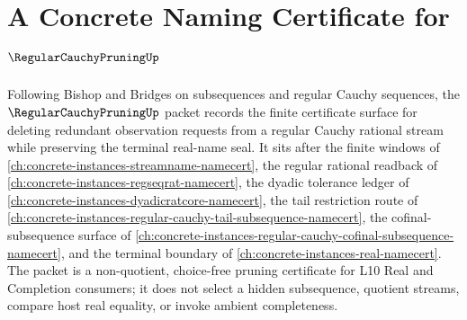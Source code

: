 \chapter{A Concrete Naming Certificate for $\RegularCauchyPruningUp$}
\label{ch:concrete-instances-regular-cauchy-pruning-namecert}

Following Bishop and Bridges on subsequences and regular Cauchy sequences, the $\RegularCauchyPruningUp$ packet records the finite certificate surface for deleting redundant observation requests from a regular Cauchy rational stream while preserving the terminal real-name seal. It sits after the finite windows of \autoref{ch:concrete-instances-streamname-namecert}, the regular rational readback of \autoref{ch:concrete-instances-regseqrat-namecert}, the dyadic tolerance ledger of \autoref{ch:concrete-instances-dyadicratcore-namecert}, the tail restriction route of \autoref{ch:concrete-instances-regular-cauchy-tail-subsequence-namecert}, the cofinal-subsequence surface of \autoref{ch:concrete-instances-regular-cauchy-cofinal-subsequence-namecert}, and the terminal boundary of \autoref{ch:concrete-instances-real-namecert}. The packet is a non-quotient, choice-free pruning certificate for L10 Real and Completion consumers; it does not select a hidden subsequence, quotient streams, compare host real equality, or invoke ambient completeness.

